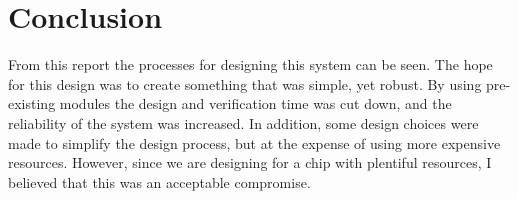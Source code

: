 \documentclass[11pt]{article}
\begin{document}
\section{Conclusion}
From this report the processes for designing this system can be seen. The hope for this design was to create something that was simple, yet robust. By using pre-existing modules the design and verification time was cut down, and the reliability of the system was increased. In addition, some design choices were made to simplify the design process, but at the expense of using more expensive resources. However, since we are designing for a chip with plentiful resources, I believed that this was an acceptable compromise.
\end{document}
